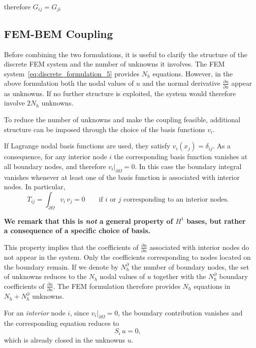 \documentclass[11pt,onecolumn]{article}
\begin{document}
therefore $G_{ij} = G_{ji}$

\subsection{FEM-BEM Coupling}

{\color{cyan}
Before combining the two formulations, it is useful to clarify the structure of the discrete FEM system and the number of unknowns it involves.  
The FEM system~\eqref{eq:discrete_formulation_5} provides $N_h$ equations. However, in the above formulation both the nodal values of $u$ and the normal derivative $\frac{\partial u}{\partial n}$ appear as unknowns. If no further structure is exploited, the system would therefore involve $2N_h$ unknowns.

To reduce the number of unknowns and make the coupling feasible, additional structure can be imposed through the choice of the basis functions $v_i$.

If Lagrange nodal basis functions are used, they satisfy $v_i(x_j)=\delta_{ij}$. As a consequence, for any interior node $i$ the corresponding basis function vanishes at all boundary nodes, and therefore $v_i|_{\partial\Omega}=0$. In this case the boundary integral vanishes whenever at least one of the basis function is associated with interior nodes. In particular,
\[
T_{ij} = \int_{\partial\Omega} v_i \, v_j = 0 
\qquad \text{if } i \text{ or } j \text{ corresponding to an interior nodes}.
\]

\textbf{We remark that this is \textit{not} a general property of $H^1$ bases, but rather a consequence of a specific choice of basis.} 

This property implies that the coefficients of $\frac{\partial u}{\partial n}$ associated with interior nodes do not appear in the system. Only the coefficients corresponding to nodes located on the boundary remain. If we denote by $N_h^{\partial}$ the number of boundary nodes, the set of unknowns reduces to the $N_h$ nodal values of $u$ together with the $N_h^{\partial}$ boundary coefficients of $\frac{\partial u}{\partial n}$. The FEM formulation therefore provides $N_h$ equations in $N_h + N_h^{\partial}$ unknowns.

For an \textit{interior} node $i$, since $v_i|_{\partial\Omega}=0$, the boundary contribution vanishes and the corresponding equation reduces to
\begin{equation}
S_i\, u = 0,
\label{eq:interior_row}
\end{equation}
which is already closed in the unknowns $u$.

}
\end{document}
